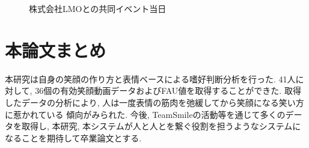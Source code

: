 \begin{figure}[htbp]
    \begin{center}
    \end{center}
    \caption{株式会社LMOとの共同イベント当日}
    \label{fig:kyushu}
\end{figure}

\section{本論文まとめ}
本研究は自身の笑顔の作り方と表情ベースによる嗜好判断分析を行った.
41人に対して, 36個の有効笑顔動画データおよびFAU値を取得することができた.
取得したデータの分析により, 人は一度表情の筋肉を弛緩してから笑顔になる笑い方に惹かれている
傾向がみられた.
今後, TeamSmileの活動等を通じて多くのデータを取得し, 本研究, 本システムが人と人とを繋ぐ役割を担うようなシステムになることを期待して卒業論文とする.
